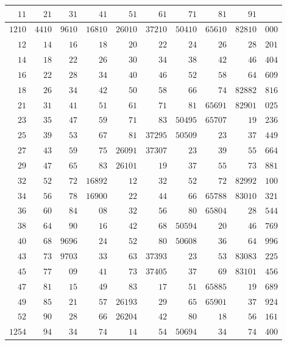 \begin{longtable}{@{}r|r|r|r|r|r|r|r|r|r@{}}
\hline
$11$ & $21$ & $31$ & $41$ & $51$ & $61$ & $71$ & $81$ & $91$ & \\
\hline\endhead
$1210$ & $4410$ & $9610$ & $16810$ & $26010$ & $37210$ & $50410$ & $65610$ & $82810$ & $000$\\
$12$ & $14$ & $16$ & $18$ & $20$ & $22$ & $24$ & $26$ & $28$ & $201$\\
$14$ & $18$ & $22$ & $26$ & $30$ & $34$ & $38$ & $42$ & $46$ & $404$\\
$16$ & $22$ & $28$ & $34$ & $40$ & $46$ & $52$ & $58$ & $64$ & $609$\\
$18$ & $26$ & $34$ & $42$ & $50$ & $58$ & $66$ & $74$ & $82882$ & $816$\\
$21$ & $31$ & $41$ & $51$ & $61$ & $71$ & $81$ & $65691$ & $82901$ & $025$\\
$23$ & $35$ & $47$ & $59$ & $71$ & $83$ & $50495$ & $65707$ & $19$ & $236$\\
$25$ & $39$ & $53$ & $67$ & $81$ & $37295$ & $50509$ & $23$ & $37$ & $449$\\
$27$ & $43$ & $59$ & $75$ & $26091$ & $37307$ & $23$ & $39$ & $55$ & $664$\\
$29$ & $47$ & $65$ & $83$ & $26101$ & $19$ & $37$ & $55$ & $73$ & $881$\\
$32$ & $52$ & $72$ & $16892$ & $12$ & $32$ & $52$ & $72$ & $82992$ & $100$\\
$34$ & $56$ & $78$ & $16900$ & $22$ & $44$ & $66$ & $65788$ & $83010$ & $321$\\
$36$ & $60$ & $84$ & $08$ & $32$ & $56$ & $80$ & $65804$ & $28$ & $544$\\
$38$ & $64$ & $90$ & $16$ & $42$ & $68$ & $50594$ & $20$ & $46$ & $769$\\
$40$ & $68$ & $9696$ & $24$ & $52$ & $80$ & $50608$ & $36$ & $64$ & $996$\\
$43$ & $73$ & $9703$ & $33$ & $63$ & $37393$ & $23$ & $53$ & $83083$ & $225$\\
$45$ & $77$ & $09$ & $41$ & $73$ & $37405$ & $37$ & $69$ & $83101$ & $456$\\
$47$ & $81$ & $15$ & $49$ & $83$ & $17$ & $51$ & $65885$ & $19$ & $689$\\
$49$ & $85$ & $21$ & $57$ & $26193$ & $29$ & $65$ & $65901$ & $37$ & $924$\\
$52$ & $90$ & $28$ & $66$ & $26204$ & $42$ & $80$ & $18$ & $56$ & $161$\\
$1254$ & $94$ & $34$ & $74$ & $14$ & $54$ & $50694$ & $34$ & $74$ & $400$\\

\end{longtable}
